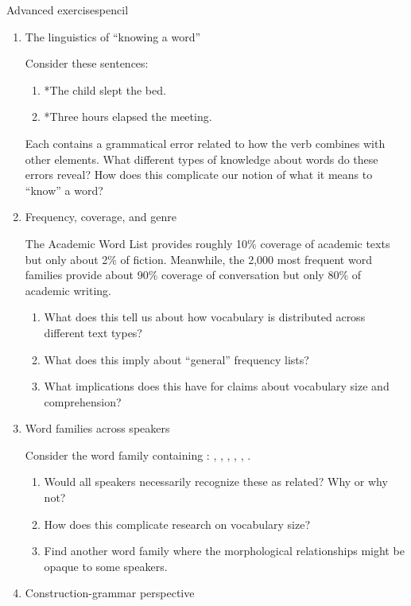 \begin{tblsframedsymbol}{Advanced exercises}{pencil}
\begin{enumerate}[noitemsep, leftmargin=*]
    \item The linguistics of \enquote{knowing a word}

    Consider these sentences:
    \begin{enumerate}[nosep]
        \item *The child slept the bed.
        \item *Three hours elapsed the meeting.
    \end{enumerate}

    Each contains a grammatical error related to how the verb combines with other elements. What different types of knowledge about words do these errors reveal? How does this complicate our notion of what it means to \enquote{know} a word?

    \item Frequency, coverage, and genre

    The Academic Word List provides roughly 10\% coverage of academic texts but only about 2\% of fiction. Meanwhile, the 2,000 most frequent word families provide about 90\% coverage of conversation but only 80\% of academic writing.
    \begin{enumerate}[nosep]
        \item What does this tell us about how vocabulary is distributed across different text types?
        \item What does this imply about \enquote{general} frequency lists?
        \item What implications does this have for claims about vocabulary size and comprehension?
    \end{enumerate}

    \item Word families across speakers

    Consider the word family containing : , , , , , .
    \begin{enumerate}[nosep]
        \item Would all speakers necessarily recognize these as related? Why or why not?
        \item How does this complicate research on vocabulary size?
        \item Find another word family where the morphological relationships might be opaque to some speakers.
    \end{enumerate}

    \item Construction-grammar perspective


\end{enumerate}
\end{tblsframedsymbol}
